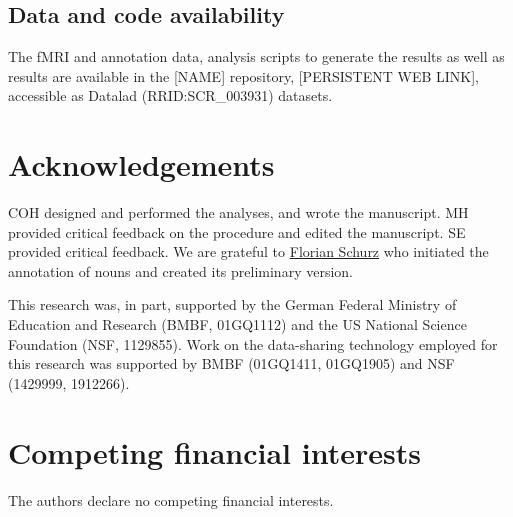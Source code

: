 \documentclass[english]{article}
\begin{document}
\subsection*{Data and code availability}

The fMRI and annotation data, analysis scripts to generate the results as well
as results are available in the [NAME] repository, [PERSISTENT WEB LINK],
accessible as Datalad (RRID:SCR\_003931) datasets.


\section*{Acknowledgements}

%
COH designed and performed the analyses, and wrote the manuscript.
%
MH provided critical feedback on the procedure and edited the manuscript.
%
SE provided critical feedback.
%
We are grateful to \href{www.florianschurz.de}{Florian Schurz} who initiated the
annotation of nouns and created its preliminary version.%

This research was, in part, supported by the German Federal Ministry of
Education and Research (BMBF, 01GQ1112) and the US National Science Foundation
(NSF, 1129855). Work on the data-sharing technology employed for this research
was supported by BMBF (01GQ1411, 01GQ1905) and NSF (1429999, 1912266).

\section*{Competing financial interests}
The authors declare no competing financial interests.


{\small
}

%
%
\end{document}
